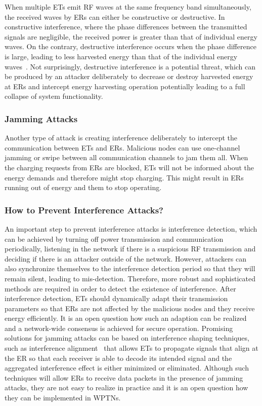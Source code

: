 \documentclass[journal,10pt,draftclsnofoot,onecolumn]{IEEEtran}
\begin{document}
When multiple ETs emit RF waves at the same frequency band simultaneously, the received waves by ERs can either be constructive or destructive. In constructive interference, where the phase differences between the transmitted signals are negligible, the received power is greater than that of individual energy waves. On the contrary, destructive interference occurs when the phase difference is large, leading to less harvested energy than that of the individual energy waves~\cite{naderi_twc_2014}. Not surprisingly, destructive interference is a potential threat, which can be produced by an attacker deliberately to decrease or destroy harvested energy at ERs and intercept energy harvesting operation potentially leading to a full collapse of system functionality.

\subsubsection{Jamming Attacks}

Another type of attack is creating interference deliberately to intercept the communication between ETs and ERs. Malicious nodes can use one-channel jamming or swipe between all communication channels to jam them all. When the charging requests from ERs are blocked, ETs will not be informed about the energy demands and therefore might stop charging. This might result in ERs running out of energy and them to stop operating. 

\subsubsection{How to Prevent Interference Attacks?}

An important step to prevent interference attacks is interference detection, which can be achieved by turning off power transmission and communication periodically, listening in the network if there is a suspicious RF transmission and deciding if there is an attacker outside of the network. However, attackers can also synchronize themselves to the interference detection period so that they will remain silent, leading to mis-detection. Therefore, more robust and sophisticated methods are required in order to detect the existence of interference. After interference detection, ETs should dynamically adapt their transmission parameters so that ERs are not affected by the malicious nodes and they receive energy efficiently. It is an open question how such an adaption can be realized and a network-wide consensus is achieved for secure operation. Promising solutions for jamming attacks can be based on interference shaping techniques, such as interference alignment~\cite{elayach2013interferencealignment} that allows ETs to propagate signals that align at the ER so that each receiver is able to decode its intended signal and the aggregated interference effect is either minimized or eliminated. Although such techniques will allow ERs to receive data packets in the presence of jamming attacks, they are not easy to realize in practice and it is an open question how they can be implemented in WPTNs. 
\end{document}
